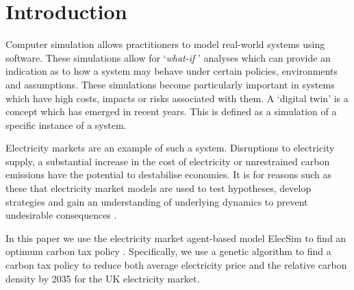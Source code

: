 \documentclass[sigconf]{acmart}
\begin{document}





\maketitle

\section{Introduction}



Computer simulation allows practitioners to model real-world systems using software. These simulations allow for `\textit{what-if} ' analyses which can provide an indication as to how a system may behave under certain policies, environments and assumptions. These simulations become particularly important in systems which have high costs, impacts or risks associated with them. A `digital twin' is a concept which has emerged in recent years. This is defined as a simulation of a specific instance of a system.


Electricity markets are an example of such a system. Disruptions to electricity supply, a substantial increase in the cost of electricity or unrestrained carbon emissions have the potential to destabilise economies\cite{Kaseke2013,Masson-Delmotte2018}. It is for reasons such as these that electricity market models are used to test hypotheses, develop strategies and gain an understanding of underlying dynamics to prevent undesirable consequences \cite{Jebaraj2006}. 

In this paper we use the electricity market agent-based model ElecSim to find an optimum carbon tax policy \cite{Kell}. Specifically, we use a genetic algorithm to find a carbon tax policy to reduce both average electricity price and the relative carbon density by 2035 for the UK electricity market. 
\end{document}
